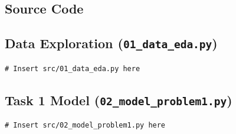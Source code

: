 \documentclass{mcmthesis}
\begin{document}
\begin{appendices}

\section{Source Code}

\subsection{Data Exploration (\texttt{01\_data\_eda.py})}

\begin{lstlisting}[style=pythonstyle, caption={Data exploration and preprocessing.}]
# Insert src/01_data_eda.py here
\end{lstlisting}

\subsection{Task 1 Model (\texttt{02\_model\_problem1.py})}

\begin{lstlisting}[style=pythonstyle, caption={Task 1 model implementation.}]
# Insert src/02_model_problem1.py here
\end{lstlisting}

\end{appendices}
\end{document}
